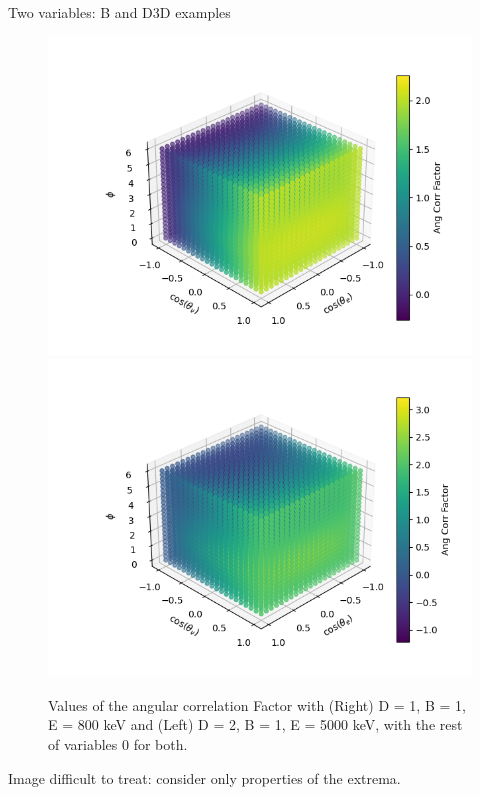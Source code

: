 \documentclass{beamer}
\begin{document}
\begin{frame}{Two variables: B and D}{3D examples}
	\begin{figure}
		\centering
		\includegraphics[width=0.4\paperwidth]{plots/posD_posB_medE_3D}
		\includegraphics[width=0.4\paperwidth]{plots/posD_posB_hiD_3D}
		\caption{Values of the angular correlation Factor with (Right) D = 1, B = 1, E = 800 keV and (Left) D = 2, B = 1, E = 5000 keV, with the rest of variables 0 for both.}
	\end{figure}
	Image difficult to treat: consider only properties of the extrema.
\end{frame}
\end{document}
